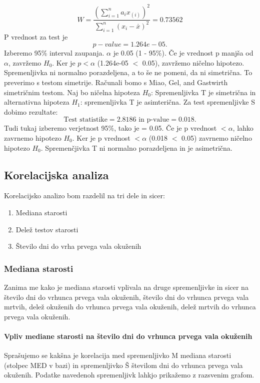 \documentclass[a4paper,11pt]{article}
\begin{document}
\[W = \frac{(\sum_{i = 1}^{n}a_i x_{(i)})^2}{\sum_{i = 1}^{n}(x_i - \overset{\_}{x})^2} = 0.73562\]
 P vrednost za test je 
\[ p-value = 1.264e-05. \]
Izberemo 95\% interval zaupanja. \(\alpha\) je 0.05 (1 - 95\%). Če je vrednost p manjša od \(\alpha\), zavržemo \(H_0\). Ker je \(p < \alpha\) (1.264e-05 \(<\) 0.05), zavržemo ničelno hipotezo. Spremenljivka ni normalno porazdeljena, a to še ne pomeni, da ni simetrična. To preverimo s testom simetrije. Računali bomo s Miao, Gel, and Gastwirth simetričnim testom. Naj bo ničelna hipoteza \(H_0\): Spremenljivka T je simetrična in alternativna hipoteza \(H_1\): spremenljivka T je asimterična. Za test spremenljivke S dobimo rezultate:
\[\text{Test statistike} = 2.8186 \text{ in p-value} =  0.018.\]
Tudi tukaj izberemo verjetnost 95\%, tako je \alpha = 0.05. Če je p vrednost \(< \alpha\), lahko zavrnemo hipotezo \(H_0\). Ker je p vrednost \(< \alpha\) (0.018 \(<\) 0.05) zavrnemo ničelno hipotezo \(H_0\). Spremenčjivka T ni normalno porazdeljena in je asimetrična.

\subsection{Korelacijska analiza}
Korelacijsko analizo bom razdelil na tri dele in sicer:
\begin{enumerate}
\item{Mediana starosti}
\item{Delež testov starosti}
\item{Število dni do vrha prvega vala okuženih}
\end{enumerate}

\subsubsection{Mediana starosti}
Zanima me kako je mediana starosti vplivala na druge spremenljivke in sicer na število dni do vrhunca prvega vala okuženih, število dni do vrhunca prvega vala mrtvih, delež okuženih do vrhunca prvega vala okuženih, delež mrtvih do vrhunca prvega vala okuženih.

\paragraph{Vpliv mediane starosti na število dni do vrhunca prvega vala okuženih}
Sprašujemo se kakšna je korelacija med spremenljivko M mediana starosti (stolpec MED v bazi) in spremenljivko Š številom dni do vrhunca prvega vala okuženih. Podatke navedenoh spremenljivk lahkjo prikažemo z razsvenim grafom.
\end{document}
